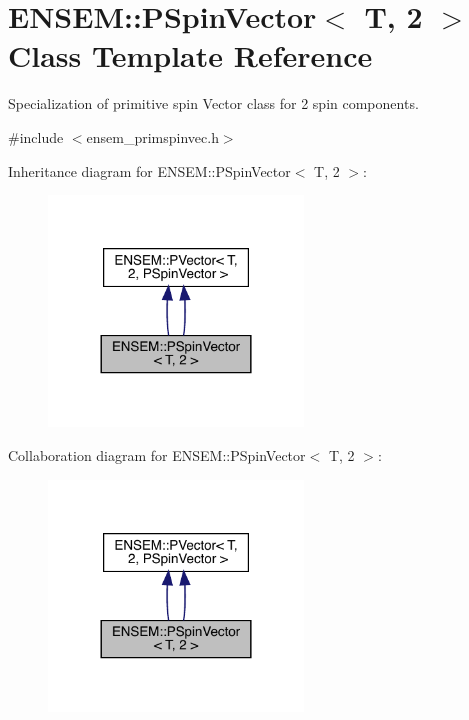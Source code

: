 \hypertarget{classENSEM_1_1PSpinVector_3_01T_00_012_01_4}{}\section{E\+N\+S\+EM\+:\+:P\+Spin\+Vector$<$ T, 2 $>$ Class Template Reference}
\label{classENSEM_1_1PSpinVector_3_01T_00_012_01_4}


Specialization of primitive spin Vector class for 2 spin components.  




{\ttfamily \#include $<$ensem\+\_\+primspinvec.\+h$>$}



Inheritance diagram for E\+N\+S\+EM\+:\+:P\+Spin\+Vector$<$ T, 2 $>$\+:\nopagebreak
\begin{figure}[H]
\begin{center}
\leavevmode
\includegraphics[width=192pt]{db/d58/classENSEM_1_1PSpinVector_3_01T_00_012_01_4__inherit__graph}
\end{center}
\end{figure}


Collaboration diagram for E\+N\+S\+EM\+:\+:P\+Spin\+Vector$<$ T, 2 $>$\+:\nopagebreak
\begin{figure}[H]
\begin{center}
\leavevmode
\includegraphics[width=192pt]{dc/da2/classENSEM_1_1PSpinVector_3_01T_00_012_01_4__coll__graph}
\end{center}
\end{figure}
